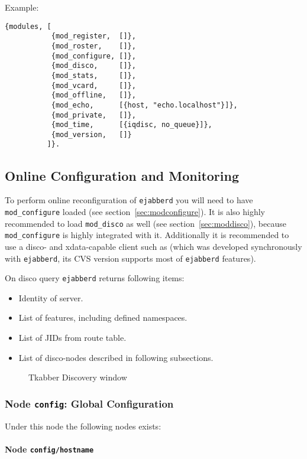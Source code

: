 \documentclass[10pt]{article}
\newcommand{\imgscale}{0.58}
\newcommand{\insimg}[1]{\insscaleimg{\imgscale}{#1}}
\newcommand{\insscaleimg}[2]{
  \imgsrc{#2}{}
  \begin{latexonly}
    \scalebox{#1}{\texttt{[image: \#2]}}
  \end{latexonly}
}
\newcommand{\ejabberd}{\texttt{ejabberd}}
\newcommand{\modconfigure}{\texttt{mod\_configure}}
\newcommand{\moddisco}{\texttt{mod\_disco}}
\begin{document}
Example:
\begin{verbatim}
{modules, [
           {mod_register,  []},
           {mod_roster,    []},
           {mod_configure, []},
           {mod_disco,     []},
           {mod_stats,     []},
           {mod_vcard,     []},
           {mod_offline,   []},
           {mod_echo,      [{host, "echo.localhost"}]},
           {mod_private,   []},
           {mod_time,      [{iqdisc, no_queue}]},
           {mod_version,   []}
          ]}.
\end{verbatim}


\subsection{Online Configuration and Monitoring}
\label{sec:onlineconfig}

To perform online reconfiguration of \ejabberd{} you will need to have
\modconfigure{} loaded (see section~\ref{sec:modconfigure}). It is also highly
recommended to load \moddisco{} as well (see section~\ref{sec:moddisco}),
because \modconfigure{} is highly integrated with it.  Additionally it is
recommended to use a disco- and xdata-capable client such as
(which was developed synchronously with \ejabberd{}, its CVS version
supports most of \ejabberd{} features).




On disco query \ejabberd{} returns following items:
\begin{itemize}
\item Identity of server.
\item List of features, including defined namespaces.
\item List of JIDs from route table.
\item List of disco-nodes described in following subsections.
\end{itemize}
\begin{figure}[htbp]
  \centering
  \insimg{disco.png}
  \caption{Tkabber Discovery window}
  \label{fig:disco}
\end{figure}

\subsubsection{Node \texttt{config}: Global Configuration}

Under this node the following nodes exists:

\paragraph{Node \texttt{config/hostname}}
\end{document}
